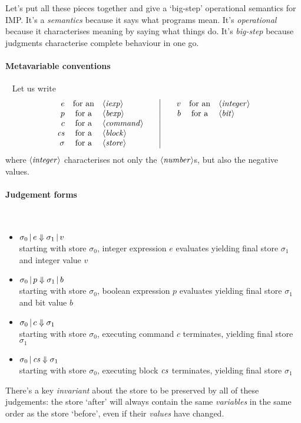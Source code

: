 \documentclass{article}
\begin{document}
Let's put all these pieces together and give a `big-step' operational semantics for IMP. It's a \emph{semantics} because it says what programs mean. It's \emph{operational} because it characterises meaning by saying what things do. It's \emph{big-step} because judgments characterise complete behaviour in one go.

\paragraph{Metavariable conventions}~ Let us write
\[\begin{array}{rcl@{\qquad}|@{\qquad}rcl}
    e & \mbox{for an} & \NT{iexp} & v & \mbox{for an} & \NT{integer} \\
    p & \mbox{for a} & \NT{bexp} & b & \mbox{for a} & \NT{bit} \\
    c & \mbox{for a} & \NT{command} & & & \\
    \cs & \mbox{for a} & \NT{block} & & & \\
    \sigma & \mbox{for a} & \NT{store} &&&\\
\end{array}\]
where $\langle \mathit{integer} \rangle$ characterises not only the $\langle \mathit{number} \rangle$s, but also the negative values.

\paragraph{Judgement forms}~
\begin{itemize}
\item $\sigma_0 \,|\, e \Downarrow \sigma_1 \,|\, v$\\
  starting with store $\sigma_0$, integer expression $e$ evaluates yielding final store $\sigma_1$ and integer value $v$
\item $\sigma_0 \,|\, p \Downarrow \sigma_1 \,|\, b$\\
  starting with store $\sigma_0$, boolean expression $p$ evaluates yielding final store $\sigma_1$ and bit value $b$
\item $\sigma_0 \,|\, c \Downarrow \sigma_1$\\
  starting with store $\sigma_0$, executing command $c$ terminates, yielding final store $\sigma_1$ 
\item $\sigma_0 \,|\, \mathit{cs} \Downarrow \sigma_1$\\
  starting with store $\sigma_0$, executing block $\mathit{cs}$ terminates, yielding final store $\sigma_1$ 
\end{itemize}

There's a key \emph{invariant} about the store to be preserved by all
of these judgements: the store `after' will always contain the same
\emph{variables} in the same order as the store `before', even if
their \emph{values} have changed.
\end{document}
